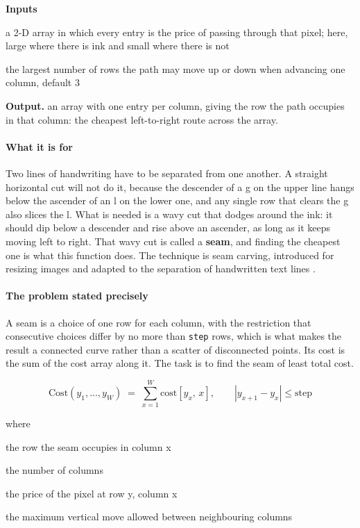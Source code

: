 \noindent\textbf{Inputs}
\begin{description}[leftmargin=2.2em,style=nextline,font=\normalfont\ttfamily]\setlength\itemsep{1pt}
  \item[{cost}] \normalfont a 2-D array in which every entry is the price of passing through that pixel; here, large where there is ink and small where there is not
  \item[{step}] \normalfont the largest number of rows the path may move up or down when advancing one column, default 3
\end{description}

\noindent\textbf{Output.} an array with one entry per column, giving the row the path occupies in that column: the cheapest left-to-right route across the array.


\paragraph{What it is for}
Two lines of handwriting have to be separated from one another. A straight horizontal cut will not do it, because the descender of a g on the upper line hangs below the ascender of an l on the lower one, and any single row that clears the g also slices the l. What is needed is a wavy cut that dodges around the ink: it should dip below a descender and rise above an ascender, as long as it keeps moving left to right. That wavy cut is called a \textbf{seam}, and finding the cheapest one is what this function does. The technique is seam carving, introduced for resizing images \cite{avidan2007} and adapted to the separation of handwritten text lines \cite{arvanitopoulos2014}.


\paragraph{The problem stated precisely}
A seam is a choice of one row for each column, with the restriction that consecutive choices differ by no more than \texttt{step} rows, which is what makes the result a connected curve rather than a scatter of disconnected points. Its cost is the sum of the cost array along it. The task is to find the seam of least total cost.


\begin{equation}
\mathrm{Cost}(y_1,\dots,y_W) \;=\; \sum_{x=1}^{W} \mathrm{cost}[y_x,\,x], \qquad |y_{x+1} - y_{x}| \le \mathrm{step}
\end{equation}

\noindent where
\begin{description}[leftmargin=2.4em,style=nextline,font=\normalfont\ttfamily]\setlength\itemsep{1pt}
  \item[{$y_x$}] \normalfont the row the seam occupies in column x
  \item[{$W$}] \normalfont the number of columns
  \item[{$\mathrm{cost}[y,x]$}] \normalfont the price of the pixel at row y, column x
  \item[{$\mathrm{step}$}] \normalfont the maximum vertical move allowed between neighbouring columns
\end{description}

